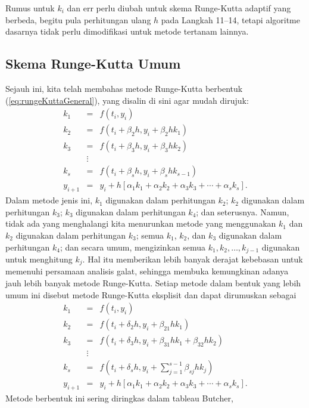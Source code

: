 \noindent Rumus untuk $k_{i}$ dan err perlu diubah untuk skema Runge-Kutta
adaptif yang berbeda, begitu pula perhitungan ulang $h$ pada Langkah
11--14, tetapi algoritme dasarnya tidak perlu dimodifikasi untuk
metode tertanam lainnya.

\subsection{Skema Runge-Kutta Umum}

Sejauh ini, kita telah membahas metode Runge-Kutta berbentuk (\ref{eq:rungeKuttaGeneral}),
yang disalin di sini agar mudah dirujuk:
\begin{eqnarray*}
k_{1} & = & f(t_{i},y_{i})\\
k_{2} & = & f\left(t_{i}+\beta_{2}h,y_{i}+\beta_{2}hk_{1}\right)\\
k_{3} & = & f(t_{i}+\beta_{3}h,y_{i}+\beta_{3}hk_{2})\\
 & \vdots\\
k_{s} & = & f(t_{i}+\beta_{s}h,y_{i}+\beta_{s}hk_{s-1})\\
y_{i+1} & = & y_{i}+h\left[\alpha_{1}k_{1}+\alpha_{2}k_{2}+\alpha_{3}k_{3}+\cdots+\alpha_{s}k_{s}\right].
\end{eqnarray*}
Dalam metode jenis ini, $k_{1}$ digunakan dalam perhitungan $k_{2}$;
$k_{2}$ digunakan dalam perhitungan $k_{3}$; $k_{3}$ digunakan
dalam perhitungan $k_{4}$; dan seterusnya. Namun, tidak ada yang
menghalangi kita menurunkan metode yang menggunakan $k_{1}$ dan $k_{2}$
digunakan dalam perhitungan $k_{3}$; semua $k_{1}$, $k_{2}$, dan
$k_{3}$ digunakan dalam perhitungan $k_{4}$; dan secara umum, mengizinkan
semua $k_{1},k_{2},\ldots,k_{j-1}$ digunakan untuk menghitung $k_{j}$.
Hal itu memberikan lebih banyak derajat kebebasan untuk memenuhi persamaan
analisis galat, sehingga membuka kemungkinan adanya jauh lebih banyak
metode Runge-Kutta. Setiap metode dalam bentuk yang lebih umum ini
disebut metode Runge-Kutta eksplisit dan dapat dirumuskan sebagai
\begin{eqnarray}
k_{1} & = & f(t_{i},y_{i})\nonumber \\
k_{2} & = & f\left(t_{i}+\delta_{2}h,y_{i}+\beta_{21}hk_{1}\right)\nonumber \\
k_{3} & = & f(t_{i}+\delta_{3}h,y_{i}+\beta_{31}hk_{1}+\beta_{32}hk_{2})\nonumber \\
 & \vdots\nonumber \\
k_{s} & = & f(t_{i}+\delta_{s}h,y_{i}+\sum_{j=1}^{s-1}\beta_{sj}hk_{j})\nonumber \\
y_{i+1} & = & y_{i}+h\left[\alpha_{1}k_{1}+\alpha_{2}k_{2}+\alpha_{3}k_{3}+\cdots+\alpha_{s}k_{s}\right].\label{eq:Runge-Kutta-explicit}
\end{eqnarray}
Metode berbentuk ini sering diringkas dalam tableau Butcher,

